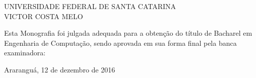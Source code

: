 
%
% 
%
\begin{folhadeaprovacao}


\begin{center}


            {UNIVERSIDADE FEDERAL DE SANTA CATARINA} \\
           

    \vspace{1.5cm}
                                    {VICTOR COSTA MELO}\\
    \bfseries{}
\end{center}

Esta Monografia foi julgada adequada para a obten\c{c}\~{a}o do título  de Bacharel em Engenharia de Computação, sendo aprovada em sua forma final  pela banca examinadora:

    \vspace{2.5cm}
    \vspace{3 cm}%

    \begin{center}
        Araranguá, 12 de dezembro de 2016
    \end{center}
  
\end{folhadeaprovacao}